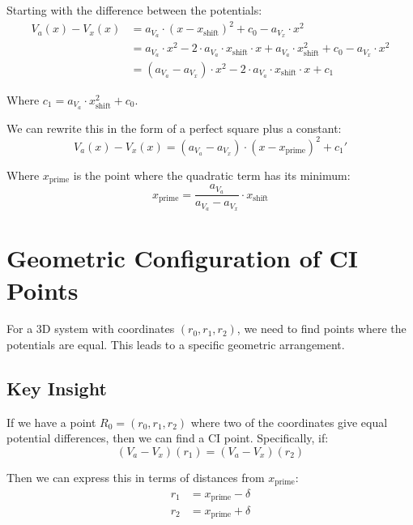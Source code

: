 \documentclass{article}
\begin{document}
Starting with the difference between the potentials:
\begin{align}
V_a(x) - V_x(x) &= a_{V_a} \cdot (x - x_{\text{shift}})^2 + c_0 - a_{V_x} \cdot x^2 \\
&= a_{V_a} \cdot x^2 - 2 \cdot a_{V_a} \cdot x_{\text{shift}} \cdot x + a_{V_a} \cdot x_{\text{shift}}^2 + c_0 - a_{V_x} \cdot x^2 \\
&= (a_{V_a} - a_{V_x}) \cdot x^2 - 2 \cdot a_{V_a} \cdot x_{\text{shift}} \cdot x + c_1
\end{align}

Where $c_1 = a_{V_a} \cdot x_{\text{shift}}^2 + c_0$.

We can rewrite this in the form of a perfect square plus a constant:
\begin{equation}
V_a(x) - V_x(x) = (a_{V_a} - a_{V_x}) \cdot (x - x_{\text{prime}})^2 + c_1'
\end{equation}

Where $x_{\text{prime}}$ is the point where the quadratic term has its minimum:
\begin{equation}
x_{\text{prime}} = \frac{a_{V_a}}{a_{V_a} - a_{V_x}} \cdot x_{\text{shift}}
\end{equation}

\section{Geometric Configuration of CI Points}

For a 3D system with coordinates $(r_0, r_1, r_2)$, we need to find points where the potentials are equal. This leads to a specific geometric arrangement.

\subsection{Key Insight}

If we have a point $R_0 = (r_0, r_1, r_2)$ where two of the coordinates give equal potential differences, then we can find a CI point. Specifically, if:
\begin{equation}
(V_a - V_x)(r_1) = (V_a - V_x)(r_2)
\end{equation}

Then we can express this in terms of distances from $x_{\text{prime}}$:
\begin{align}
r_1 &= x_{\text{prime}} - \delta \\
r_2 &= x_{\text{prime}} + \delta
\end{align}
\end{document}

